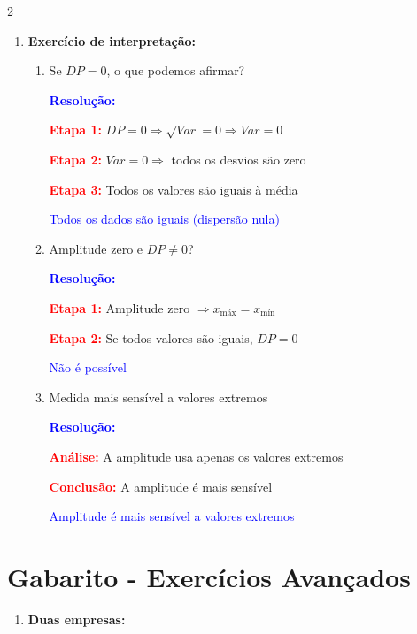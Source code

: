 \documentclass[11pt]{article}
\newcommand{\respostaNum}[1]{\textcolor{blue}{\boxed{#1}}}
\newcommand{\respostaTxt}[1]{\textcolor{blue}{#1}}
\newcommand{\resolucao}{\textbf{\textcolor{blue}{Resolução:}}}
\begin{document}
\begin{multicols}{2}
\begin{enumerate}[leftmargin=*]
\begin{enumerate}[label=\alph*)]
\resolucao

$DP = \sqrt{32} = \sqrt{16 \cdot 2} = \respostaNum{4\sqrt{2} \approx 5,66}$
\end{enumerate}

\item \textbf{Exercício de interpretação:}

\begin{enumerate}[label=\alph*)]
\item Se $DP = 0$, o que podemos afirmar?

\resolucao

\textbf{\textcolor{red}{Etapa 1:}} $DP = 0 \Rightarrow \sqrt{Var} = 0 \Rightarrow Var = 0$

\textbf{\textcolor{red}{Etapa 2:}} $Var = 0 \Rightarrow$ todos os desvios são zero

\textbf{\textcolor{red}{Etapa 3:}} Todos os valores são iguais à média

\respostaTxt{Todos os dados são iguais (dispersão nula)}

\item Amplitude zero e $DP \neq 0$?

\resolucao

\textbf{\textcolor{red}{Etapa 1:}} Amplitude zero $\Rightarrow x_{\text{máx}} = x_{\text{mín}}$

\textbf{\textcolor{red}{Etapa 2:}} Se todos valores são iguais, $DP = 0$

\respostaTxt{Não é possível}

\item Medida mais sensível a valores extremos

\resolucao

\textbf{\textcolor{red}{Análise:}} A amplitude usa apenas os valores extremos

\textbf{\textcolor{red}{Conclusão:}} A amplitude é mais sensível

\respostaTxt{Amplitude é mais sensível a valores extremos}
\end{enumerate}
\end{enumerate}

\section*{Gabarito - Exercícios Avançados}

\begin{enumerate}[leftmargin=*, start=11]

\item \textbf{Duas empresas:}


\end{enumerate}
\end{multicols}
\end{document}
